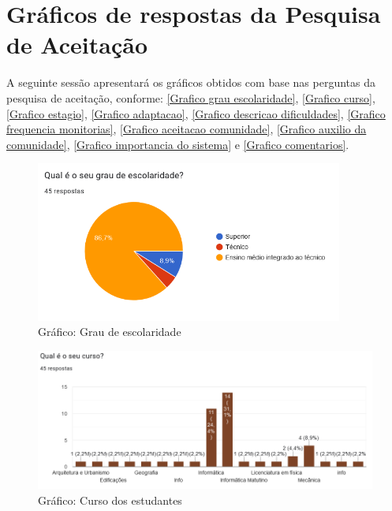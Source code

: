 \chapter{Gráficos de respostas da Pesquisa de Aceitação}
\label{graficos_pesqAceitacao}

A seguinte sessão apresentará os gráficos obtidos com base nas perguntas da pesquisa de aceitação, conforme: \autoref{Grafico grau escolaridade}, \autoref{Grafico curso}, \autoref{Grafico estagio}, \autoref{Grafico adaptacao}, \autoref{Grafico descricao dificuldades}, \autoref{Grafico frequencia monitorias}, \autoref{Grafico aceitacao comunidade}, \autoref{Grafico auxilio da comunidade}, \autoref{Grafico importancia do sistema} e \autoref{Grafico comentarios}.



\begin{figure}[htb]
\centering
\caption{Gráfico: Grau de escolaridade}
\label{Grafico grau escolaridade}
\includegraphics[width=0.9\textwidth]{anexos/Imagens_PesquisaAceitacao/p01.png}
\end{figure}
\FloatBarrier

\begin{figure}[htb]
\centering
\caption{Gráfico: Curso dos estudantes}
\label{Grafico curso}
\includegraphics[width=1.0\textwidth]{anexos/Imagens_PesquisaAceitacao/p02.png}
\end{figure}
\FloatBarrier

